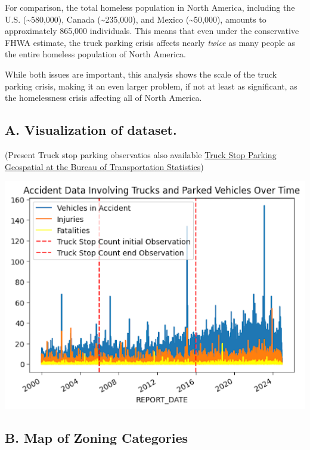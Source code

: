 \documentclass[
  12pt]{article}
\begin{document}
For comparison, the total homeless population in North America,
including the U.S. (\textasciitilde580,000), Canada
(\textasciitilde235,000), and Mexico (\textasciitilde50,000), amounts to
approximately 865,000 individuals. This means that even under the
conservative FHWA estimate, the truck parking crisis affects nearly
\emph{twice} as many people as the entire homeless population of North
America.

While both issues are important, this analysis shows the scale of the
truck parking crisis, making it an even larger problem, if not at least
as significant, as the homelessness crisis affecting all of North
America.

\subsection{\texorpdfstring{\textbf{A. Visualization of
dataset.}}{A. Visualization of dataset.}}\label{sec-a.-visualization-of-dataset.-}

(Present Truck stop parking observatios also available
\href{https://data-usdot.opendata.arcgis.com/datasets/usdot::truck-stop-parking/about}{Truck
Stop Parking \textbar{} Geospatial at the Bureau of Transportation
Statistics})

\includegraphics{images/unnamed.png}

\subsection{B. Map of Zoning
Categories}\label{sec-b.-map-of-zoning-categories}
\end{document}

